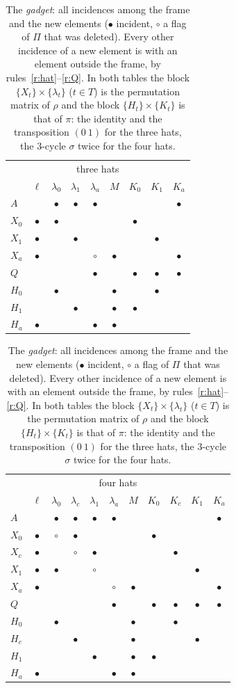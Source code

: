 \documentclass[11pt]{amsart}
\theoremstyle{definition}
\theoremstyle{remark}
\newcommand{\lam}{\lambda}
\begin{document}
\begin{table}[ht]
\centering\small
\setlength{\tabcolsep}{3.2pt}
\renewcommand{\arraystretch}{1.05}
\newcommand{\x}{$\bullet$}
\newcommand{\y}{$\circ$}
\begin{tabular}{@{}l|cccc|cccc@{}}
\multicolumn{9}{c}{three hats \cite{AL20}}\\[2pt]
& $\ell$ & $\lam_0$ & $\lam_1$ & $\lam_a$ & $M$ & $K_0$ & $K_1$ & $K_a$\\ \hline
$A$   &  & \x & \x & \x &  &  &  & \x \\
$X_0$ & \x & \x &  &  &  & \x &  &  \\
$X_1$ & \x &  & \x &  &  &  & \x &  \\
$X_a$ & \x &  &  & \y & \x &  &  & \x \\ \hline
$Q$   &  &  &  & \x &  & \x & \x & \x \\
$H_0$ &  & \x &  &  & \x &  & \x &  \\
$H_1$ &  &  & \x &  & \x & \x &  &  \\
$H_a$ & \x &  &  & \x & \x &  &  &  \\
\end{tabular}
\qquad\quad
\begin{tabular}{@{}l|ccccc|ccccc@{}}
\multicolumn{11}{c}{four hats}\\[2pt]
& $\ell$ & $\lam_0$ & $\lam_c$ & $\lam_1$ & $\lam_a$ & $M$ & $K_0$ & $K_c$ & $K_1$ & $K_a$\\ \hline
$A$   &  & \x & \x & \x & \x &  &  &  &  & \x \\
$X_0$ & \x & \y & \x &  &  &  & \x &  &  &  \\
$X_c$ & \x &  & \y & \x &  &  &  & \x &  &  \\
$X_1$ & \x & \x &  & \y &  &  &  &  & \x &  \\
$X_a$ & \x &  &  &  & \y & \x &  &  &  & \x \\ \hline
$Q$   &  &  &  &  & \x &  & \x & \x & \x & \x \\
$H_0$ &  & \x &  &  &  & \x &  & \x &  &  \\
$H_c$ &  &  & \x &  &  & \x &  &  & \x &  \\
$H_1$ &  &  &  & \x &  & \x & \x &  &  &  \\
$H_a$ & \x &  &  &  & \x & \x &  &  &  &  \\
\end{tabular}
\caption{The \emph{gadget}: all incidences among the frame and the new elements ($\bullet$ incident, $\circ$ a flag of $\Pi$ that was deleted). Every other incidence of a new element is with an element outside the frame, by rules~\ref{r:hat}--\ref{r:Q}. In both tables the block $\{X_t\}\times\{\lam_t\}$ ($t\in T$) is the permutation matrix of $\rho$ and the block $\{H_t\}\times\{K_t\}$ is that of $\pi$: the identity and the transposition $(0\ 1)$ for the three hats, the $3$-cycle $\sigma$ twice for the four hats.}
\label{tab:gadget}
\end{table}
\end{document}

